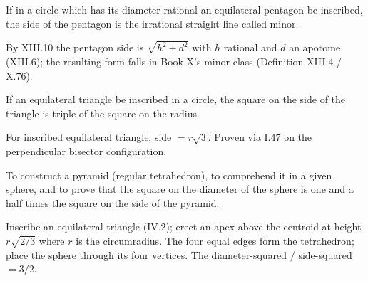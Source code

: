 \begin{claim}
\label{prop:XIII.11}
If in a circle which has its diameter rational an equilateral
pentagon be inscribed, the side of the pentagon is the irrational
straight line called minor.
\end{claim}
\begin{evidence}
\label{ev:XIII.11}
By XIII.10 the pentagon side is $\sqrt{h^2 + d^2}$ with $h$ rational
and $d$ an apotome (XIII.6); the resulting form falls in Book X's
minor class (Definition XIII.4 / X.76).
\end{evidence}

\begin{claim}
\label{prop:XIII.12}
If an equilateral triangle be inscribed in a circle, the square on
the side of the triangle is triple of the square on the radius.
\end{claim}
\begin{evidence}
\label{ev:XIII.12}
For inscribed equilateral triangle, side $= r \sqrt{3}$.  Proven via
I.47 on the perpendicular bisector configuration.
\end{evidence}

\begin{claim}
\label{prop:XIII.13}
To construct a pyramid (regular tetrahedron), to comprehend it in a
given sphere, and to prove that the square on the diameter of the
sphere is one and a half times the square on the side of the pyramid.
\end{claim}
\begin{evidence}
\label{ev:XIII.13}
Inscribe an equilateral triangle (IV.2); erect an apex above the
centroid at height $r \sqrt{2/3}$ where $r$ is the circumradius.
The four equal edges form the tetrahedron; place the sphere through
its four vertices.  The diameter-squared $/$ side-squared $= 3/2$.
\end{evidence}

